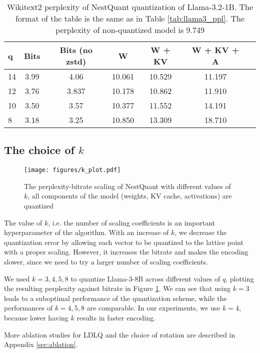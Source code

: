 \begin{table}[h]
\centering
\scriptsize
\begin{tabular}{lcccccc}
    \toprule
\textbf{q}& \textbf{Bits} & \textbf{Bits (no zstd)} &  \textbf{W}&
\textbf{W + KV}&
\textbf{W + KV + A}\\    \midrule
    14 & 3.99& 4.06& 10.061& 10.529& 11.197\\
    12 & 3.76& 3.837& 10.178& 10.862& 11.910\\
    10 & 3.50& 3.57& 10.377& 11.552& 14.191\\
    8 & 3.18& 3.25& 10.850& 13.309& 18.710\\
    \bottomrule
\end{tabular}
\ifisicml\else\vspace{1em}\fi
\caption{Wikitext2 perplexity of NestQuant quantization of Llama-3.2-1B. The format of the table is the same as in Table \ref{tab:llama3_ppl}. The perplexity of non-quantized model is 9.749} 
\label{tab:llama1b_ppl}
\end{table}

\subsection{The choice of $k$}
\label{sec:k-choice}

\begin{figure}
    \centering
    \texttt{[image: figures/k\_plot.pdf]}
    \caption{The perplexity-bitrate scaling of NestQuant with different values of $k$, all components of the model (weights, KV cache, activations) are quantized}
    \label{fig:k-plot}
\end{figure}

The value of $k$, i.e. the number of scaling coefficients is an important hyperparameter of the algorithm. With an increase of $k$, we decrease the quantization error by allowing each vector to be quantized to the lattice point with a proper scaling. However, it increases the bitrate and makes the encoding slower, since we need to try a larger number of scaling coefficients.

We used $k = 3,4,5,8$ to quantize Llama-3-8B across different values of $q$, plotting the resulting perplexity against bitrate in Figure \ref{fig:k-plot}. We can see that using $k=3$ leads to a suboptimal performance of the quantization scheme, while the performances of $k=4,5,8$ are comparable. In our experiments, we use $k=4$, because lower having $k$ results in faster encoding.

More ablation studies for LDLQ and the choice of rotation are described in Appendix \ref{sec:ablation}.
